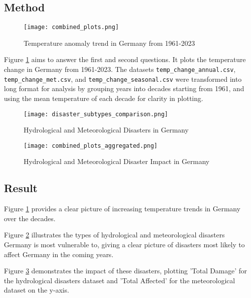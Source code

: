 \documentclass{article}
\begin{document}
\subsection{Method}

\begin{figure}[htbp]
    \centering
    \texttt{[image: combined\_plots.png]}
    \caption{Temperature anomaly trend in Germany from 1961-2023}
    \label{fig:Temperature-Anomaly}
\end{figure}

Figure \ref{fig:Temperature-Anomaly} aims to answer the first and second questions. It plots the temperature change in Germany from 1961-2023. The datasets \texttt{temp\_change\_annual.csv}, \texttt{temp\_change\_met.csv}, and \texttt{temp\_change\_seasonal.csv} were transformed into long format for analysis by grouping years into decades starting from 1961, and using the mean temperature of each decade for clarity in plotting.

\begin{figure}[htbp]
    \centering
    \texttt{[image: disaster\_subtypes\_comparison.png]}  
    \caption{Hydrological and Meteorological Disasters in Germany}
    \label{fig:Disaster-Subtypes}
\end{figure}

\begin{figure}[htbp]
    \centering
    \texttt{[image: combined\_plots\_aggregated.png]} 
    \caption{Hydrological and Meteorological Disaster Impact in Germany}
    \label{fig:Impact}
\end{figure}

\subsection{Result}

Figure \ref{fig:Temperature-Anomaly} provides a clear picture of increasing temperature trends in Germany over the decades. 

Figure \ref{fig:Disaster-Subtypes} illustrates the types of hydrological and meteorological disasters Germany is most vulnerable to, giving a clear picture of disasters most likely to affect Germany in the coming years.

Figure \ref{fig:Impact} demonstrates the impact of these disasters, plotting 'Total Damage' for the hydrological disasters dataset and 'Total Affected' for the meteorological dataset on the y-axis.
\end{document}
